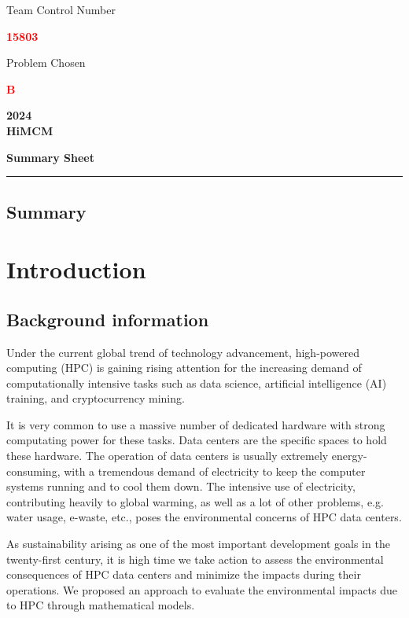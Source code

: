 \documentclass{article}
\renewcommand{\em}[1]{{\huge \textbf{\textcolor{red}{#1}}}}
\begin{document}
\thispagestyle{empty}

\begin{center}
	Team Control Number
	
	\em{15803}

	Problem Chosen
	
	\em{B}

	\textbf{\large 2024} \\
	\textbf{HiMCM}

	\textbf{\small Summary Sheet}
\end{center}

\noindent\rule{\textwidth}{1pt}

\begin{center}
	\section*{Summary}
\end{center}

\newpage

{\center\tableofcontents}

\newpage

\section{Introduction}

\subsection{Background information}

Under the current global trend of technology advancement, high-powered computing (HPC) is gaining rising attention for the increasing demand of computationally intensive tasks such as data science, artificial intelligence (AI) training, and cryptocurrency mining.

It is very common to use a massive number of dedicated hardware with strong computating power for these tasks. Data centers are the specific spaces to hold these hardware. The operation of data centers is usually extremely energy-consuming, with a tremendous demand of electricity to keep the computer systems running and to cool them down. The intensive use of electricity, contributing heavily to global warming, as well as a lot of other problems, e.g. water usage, e-waste, etc., poses the environmental concerns of HPC data centers.

As sustainability arising as one of the most important development goals in the twenty-first century, it is high time we take action to assess the environmental consequences of HPC data centers and minimize the impacts during their operations. We proposed an approach to evaluate the environmental impacts due to HPC through mathematical models.
\end{document}
